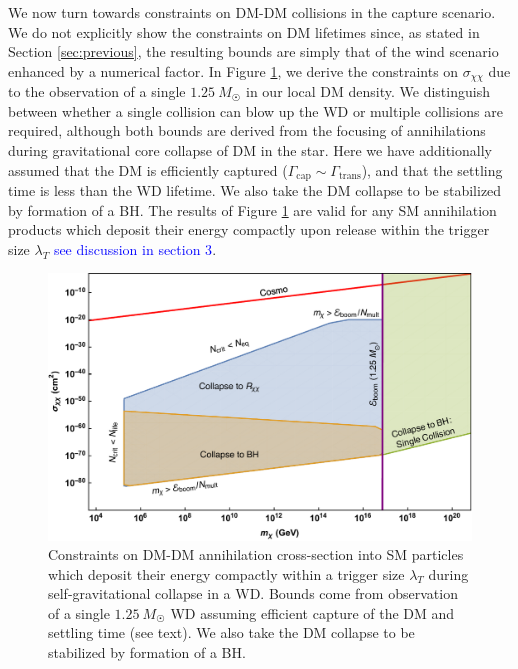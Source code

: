 \documentclass[preprintnumbers,amsmath,amssymb,prd,superscriptaddress]{revtex4}
\begin{document}
We now turn towards constraints on DM-DM collisions in the capture scenario.
We do not explicitly show the constraints on DM lifetimes since, as stated in Section \ref{sec:previous}, the resulting bounds are simply that of the wind scenario enhanced by a numerical factor. 
In Figure \ref{fig:multicapture}, we derive the constraints on $\sigma_{\chi \chi}$ due to the observation of a single $1.25 ~ M_{\astrosun}$ in our local DM density. 
We distinguish between whether a single collision can blow up the WD or multiple collisions are required, although both bounds are derived from the focusing of annihilations during gravitational core collapse of DM in the star.
Here we have additionally assumed that the DM is efficiently captured ($\Gamma_\text{cap} \sim \Gamma_\text{trans}$), and that the settling time is less than the WD lifetime.
We also take the DM collapse to be stabilized by formation of a BH.
The results of Figure \ref{fig:multicapture} are valid for any SM annihilation products which deposit their energy compactly upon release within the trigger size $\lambda_T$ \textcolor{blue}{see discussion in section 3}. 
\begin{figure}
\includegraphics[scale=.35]{multicollision.pdf}
\caption{Constraints on DM-DM annihilation cross-section into SM particles which deposit their energy compactly within a trigger size $\lambda_T$ during self-gravitational collapse in a WD. Bounds come from observation of a single $1.25~M_{\astrosun}$ WD assuming efficient capture of the DM and settling time (see text). We also take the DM collapse to be stabilized by formation of a BH.}
\label{fig:multicapture}
\end{figure}
\end{document}
